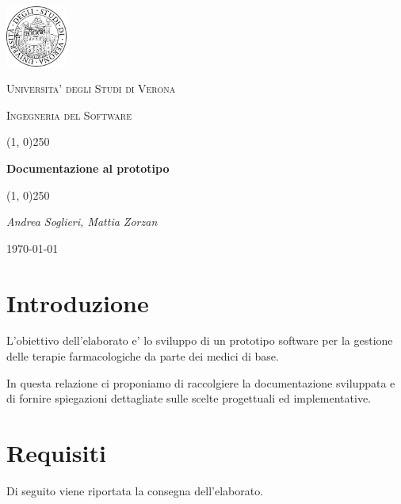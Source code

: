 \documentclass[a4paper]{article}
\begin{document}
	\clearpage
	
	\begin{titlepage}
		\centering
		\vspace*{\fill}
		
		\includegraphics[width=0.15\textwidth]{logo.png}\par\vspace{1cm}
		{\scshape\LARGE Universita' degli Studi di Verona \par}
		\vspace{1cm}
		
		{\scshape\Large Ingegneria del Software \par}
		\vspace{1.5cm}
		\line(1, 0){250}
		
		{\Large\bfseries Documentazione al prototipo \par}
		\line(1, 0){250}
		
		{\Large\itshape Andrea Soglieri, Mattia Zorzan \par}
		\vspace{5cm}
		\vspace*{\fill}
		
		{\Large \today\par}
	\end{titlepage}
	\thispagestyle{empty}
	\newpage
	\tableofcontents
	\newpage
	
	\section{Introduzione}
		L'obiettivo dell'elaborato e' lo sviluppo di un prototipo software per la gestione delle terapie farmacologiche da parte dei medici di base.
		
		In questa relazione ci proponiamo di raccolgiere la documentazione sviluppata e di fornire spiegazioni dettagliate sulle scelte progettuali ed implementative.
	\section{Requisiti}
		Di seguito viene riportata la consegna dell'elaborato.
		
\end{document}
